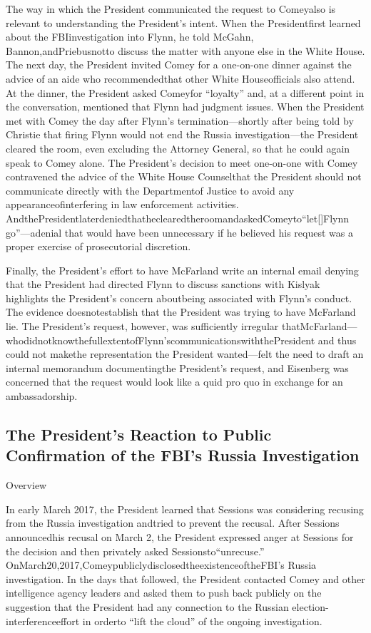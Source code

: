 The way in which the President communicated the request to Comeyalso is relevant to understanding the President’s intent. When the Presidentfirst learned about the FBIinvestigation into Flynn, he told McGahn, Bannon,andPriebusnotto discuss the matter with anyone else in the White House. The next day, the President invited Comey for a one-on-one dinner against the advice of an aide who recommendedthat other White Houseofficials also attend. At the dinner, the President asked Comeyfor “loyalty” and, at a different point in the conversation, mentioned that Flynn had judgment issues. When the President met with Comey the day after Flynn’s termination—shortly after being told by Christie that firing Flynn would not end the Russia investigation—the President cleared the room, even excluding the Attorney General, so that he could again speak to Comey alone. The President’s decision to meet one-on-one with Comey contravened the advice of the White House Counselthat the President should not communicate directly with the Departmentof Justice to avoid any appearanceofinterfering in law enforcement activities. AndthePresidentlaterdeniedthatheclearedtheroomandaskedComeyto“let[]Flynn go”—adenial that would have been unnecessary if he believed his request was a proper exercise of prosecutorial discretion.

Finally, the President’s effort to have McFarland write an internal email denying that the President had directed Flynn to discuss sanctions with Kislyak highlights the President’s concern aboutbeing associated with Flynn’s conduct. The evidence doesnotestablish that the President was trying to have McFarland lie. The President’s request, however, was sufficiently irregular thatMcFarland—whodidnotknowthefullextentofFlynn’scommunicationswiththePresident and thus could not makethe representation the President wanted—felt the need to draft an internal memorandum documentingthe President’s request, and Eisenberg was concerned that the request would look like a quid pro quo in exchange for an ambassadorship.

\subsection{The President's Reaction to Public Confirmation of the FBI's Russia Investigation}

Overview

In early March 2017, the President learned that Sessions was considering recusing from the Russia investigation andtried to prevent the recusal. After Sessions announcedhis recusal on March 2, the President expressed anger at Sessions for the decision and then privately asked Sessionsto“unrecuse.” OnMarch20,2017,ComeypubliclydisclosedtheexistenceoftheFBI’s Russia investigation. In the days that followed, the President contacted Comey and other intelligence agency leaders and asked them to push back publicly on the suggestion that the President had any connection to the Russian election-interferenceeffort in orderto “lift the cloud” of the ongoing investigation.

